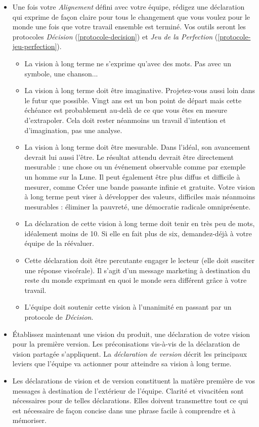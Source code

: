 \documentclass[paper=6in:9in,pagesize=pdftex,headinclude=on,footinclude=on,12pt]{scrbook}
\newcommand*{\numref}[1]{{\hyperref[{#1}]{\autoref*{#1}}}}
\begin{document}
\begin{itemize}
	\item Une fois votre \emph{Alignement} défini avec votre équipe, rédigez une déclaration qui exprime de façon claire
	      pour tous le changement que vous voulez pour le monde une fois que votre travail ensemble est terminé.
	      Vos outils seront les protocoles \emph{Décision} (\numref{protocole-decision}) et \emph{Jeu de la Perfection}
	      (\numref{protocole-jeu-perfection}).
	      \begin{itemize}
	      	\item La vision à long terme ne s'exprime qu'avec des mots. Pas avec un symbole, une chanson...
	      	\item La vision à long terme doit être imaginative. Pro\-jetez-vous aussi loin dans le futur que possible.
	      	      Vingt ans est un bon point de départ mais cette échéance est probablement au-delà de ce que vous
	      	      êtes en mesure d'extrapoler. Cela doit rester néanmoins un travail d'intention et d'imagination,
	      	      pas une analyse.
	      	\item La vision à long terme doit être mesurable. Dans l'idéal, son avancement devrait lui aussi l'être.
	      	      Le résultat attendu devrait être directement mesurable : une chose ou un événement observable comme
	      	      par exemple \og{}un homme sur la Lune\fg{}. Il peut également être plus diffus et difficile à mesurer,
	      	      comme \og{}Créer une bande passante infinie et gratuite\fg{}. Votre vision à long terme peut viser à
	      	      développer des valeurs, difficiles mais néanmoins mesurables : \og{}éliminer la pauvreté\fg{},
	      	      \og{}une démocratie radicale omniprésente\fg{}.
			\item La déclaration de cette vision à long terme doit tenir en très peu de mots, idéalement moins de 10.
			      Si elle en fait plus de six, demandez-déjà à votre équipe de la réévaluer.
			\item Cette déclaration doit être percutante engager le lecteur (elle doit susciter une réponse viscérale).
			      Il s'agit d'un message marketing à destination du reste du monde exprimant en quoi le monde sera
			      différent grâce à votre travail.
			\item L'équipe doit soutenir cette vision à l'unanimité en passant par un protocole de \emph{Décision}.
	      \end{itemize}
	\item Établissez maintenant une vision du produit, une déclaration de votre vision pour la première version. Les
	      préconisations vis-à-vis de la déclaration de vision partagée s'appliquent. La \emph{déclaration de version}
	      décrit les principaux leviers que l'équipe va actionner pour atteindre sa vision à long terme.
	\item Les déclarations de vision et de version constituent la matière première de vos messages à destination de
	      l'extérieur de l'équipe. Clarité et vivacitéen sont nécessaires pour de telles déclarations. Elles doivent
	      transmettre tout ce qui est nécessaire de façon concise dans une phrase facile à comprendre et à mémoriser.
\end{itemize}
\end{document}
